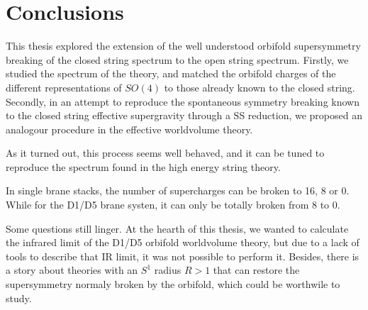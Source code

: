 \chapter{Conclusions}
\label{chap:conclusions}
\pagestyle{fancy}

This thesis explored the extension of the well understood orbifold supersymmetry breaking of the closed string spectrum to the open string spectrum. Firstly, we studied the spectrum of the theory, and matched the orbifold charges of the different representations of $SO(4)$ to those already known to the closed string. Secondly, in an attempt to reproduce the spontaneous symmetry breaking known to the closed string effective supergravity through a SS reduction, we proposed an analogour procedure in the effective worldvolume theory.

As it turned out, this process seems well behaved, and it can be tuned to reproduce the spectrum found in the high energy string theory.

In single brane stacks, the number of supercharges can be broken to 16, 8 or 0. While for the D1/D5 brane systen, it can only be totally broken from 8 to 0.

Some questions still linger. At the hearth of this thesis, we wanted to calculate the infrared limit of the D1/D5 orbifold worldvolume theory, but due to a lack of tools to describe that IR limit, it was not possible to perform it. Besides, there is a story about theories with an $S^1$ radius $R>1$ that can restore the supersymmetry normaly broken by the orbifold, which could be worthwile to study.